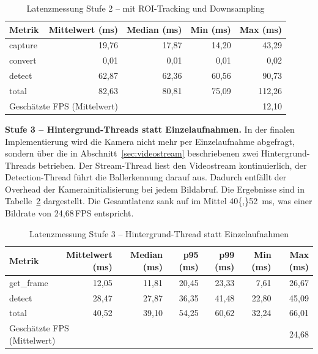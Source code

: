\documentclass[11pt, a4paper]{scrreprt}
\begin{document}
\begin{table}[h]
\centering
\caption{Latenzmessung Stufe 2 – mit ROI-Tracking und Downsampling}
\label{tab:latenz2}
\begin{tabular}{lrrrr}
  \toprule
  Metrik & Mittelwert (ms) & Median (ms) & Min (ms) & Max (ms) \\
  \midrule
  capture & 19{,}76 & 17{,}87 & 14{,}20 & 43{,}29 \\
  convert & 0{,}01  & 0{,}01  & 0{,}01  & 0{,}02  \\
  detect  & 62{,}87 & 62{,}36 & 60{,}56 & 90{,}73 \\
  total   & 82{,}63 & 80{,}81 & 75{,}09 & 112{,}26 \\
  \midrule
  \multicolumn{2}{l}{Geschätzte FPS (Mittelwert)} & \multicolumn{3}{r}{12{,}10} \\
  \bottomrule
\end{tabular}
\end{table}

\textbf{Stufe 3 – Hintergrund-Threads statt Einzelaufnahmen.}
In der finalen Implementierung wird die Kamera nicht mehr per Einzelaufnahme
abgefragt, sondern über die in Abschnitt~\ref{sec:videostream} beschriebenen
zwei Hintergrund-Threads betrieben. Der Stream-Thread liest den Videostream
kontinuierlich, der Detection-Thread führt die Ballerkennung darauf aus.
Dadurch entfällt der Overhead der Kamerainitialisierung bei jedem Bildabruf. Die Ergebnisse sind in
Tabelle~\ref{tab:latenz3} dargestellt. Die Gesamtlatenz sank auf
im Mittel \SI{40{,}52}{\milli\second}, was einer Bildrate von 24{,}68\,FPS
entspricht.
\begin{table}[h]
\centering
\caption{Latenzmessung Stufe 3 – Hintergrund-Thread statt Einzelaufnahmen}
\label{tab:latenz3}
\begin{tabular}{lrrrrrr}
  \toprule
  Metrik & Mittelwert (ms) & Median (ms) & p95 (ms) & p99 (ms) & Min (ms) & Max (ms) \\
  \midrule
  get\_frame & 12{,}05 & 11{,}81 & 20{,}45 & 23{,}33 &  7{,}61 & 26{,}67 \\
  detect     & 28{,}47 & 27{,}87 & 36{,}35 & 41{,}48 & 22{,}80 & 45{,}09 \\
  total      & 40{,}52 & 39{,}10 & 54{,}25 & 60{,}62 & 32{,}24 & 66{,}01 \\
  \midrule
  \multicolumn{2}{l}{Geschätzte FPS (Mittelwert)} & \multicolumn{5}{r}{24{,}68} \\
  \bottomrule
\end{tabular}
\end{table}
\end{document}
